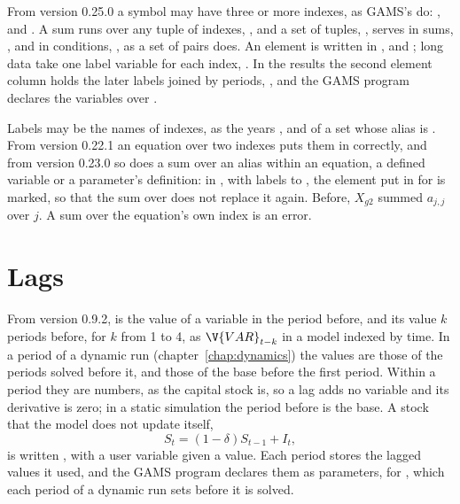 From version 0.25.0 a symbol may have three or more indexes, as GAMS's do:
,
 and . A sum runs over any tuple of indexes, ,
and a set of tuples, , serves in
sums, , and in conditions, , as a
set of pairs does. An element is written  in
,  and ; long data take
one label variable for each index, . In the
results the second element column holds the later labels joined by periods,
, and the GAMS program declares the variables over .

Labels may be the names of indexes, as the years ,  and
 of a set whose alias is . From version 0.22.1 an equation
over two indexes puts them in correctly, and from version 0.23.0 so does a
sum over an alias within an equation, a defined variable or a parameter's
definition: in , with
labels  to , the element  put in for  is
marked, so that the sum over  does not replace it again. Before,
$X_{g2}$ summed $a_{j,j}$ over $j$. A sum over the equation's own index is
an error.

\section{Lags}\label{sec:userlags}

From version 0.9.2,  is the value of a variable in the period
before, and  its value $k$ periods before, for $k$ from 1 to
4, as $\V{VAR}_{t-k}$ in a model indexed by time. In a period of a dynamic run
(chapter~\ref{chap:dynamics}) the values are those of the periods solved
before it, and those of the base before the first period. Within a period they
are numbers, as the capital stock is, so a lag adds no variable and its
derivative is zero; in a static simulation the period before is the base. A
stock that the model does not update itself,
\begin{equation*}
S_t = (1 - \delta) S_{t-1} + I_t,
\end{equation*}
is written , with 
a user variable given a value. Each period stores the lagged values it used,
and the GAMS program declares them as parameters,  for
, which each period of a dynamic run sets before it is solved.

